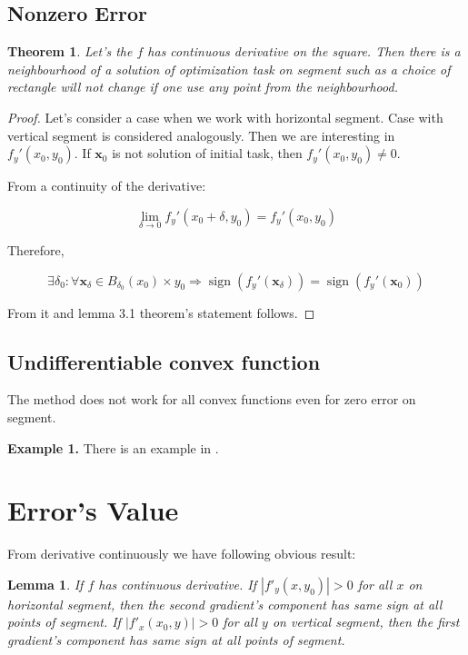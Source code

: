 \documentclass[12pt]{article}
\newtheorem{theorem}{Theorem}[section]
\newtheorem{lemma}{Lemma}[section]
\DeclareMathOperator{\sign}{sign}
\begin{document}
\subsection{Nonzero Error}
\begin{theorem}
Let's the $f$ has continuous derivative on the square. Then there is a neighbourhood of a solution of optimization task on segment such as a choice of rectangle will not change if one use any point from the   neighbourhood.
\end{theorem}
\begin{proof}
Let's consider a case when we work with horizontal segment. Case with vertical segment is considered analogously. Then we are interesting in $f_y'(x_0, y_0)$. If $\textbf{x}_0$ is not solution of initial task, then $f_y'(x_0, y_0) \neq 0$. 

From a continuity of the derivative:

$$\lim\limits_{\delta \rightarrow 0}f_y'(x_0+\delta, y_0) = f_y'(x_0, y_0)$$

Therefore, 

$$\exists \delta_0:\forall \textbf{x}_\delta\in B_{\delta_0}(x_0)\times y_0\Rightarrow \sign(f_y'(\textbf{x}_\delta)) = \sign(f_y'(\textbf{x}_0))$$

From it and lemma 3.1 theorem's statement follows.

\end{proof}

\subsection{Undifferentiable convex function}

The method does not work for all convex functions even for zero error on segment. 

\textbf{Example 1.} There is an example in \cite{Ston_Pas}.

\section{Error's Value}

From derivative continuously we have following obvious result:

\begin{lemma}
If $f$ has continuous derivative. If $|f'_y(x, y_0)| > 0$ for all $x$ on horizontal segment, then the second gradient's component has same sign at all points of segment. If $|f'_x(x_0, y)| > 0$ for all $y$ on vertical segment, then the first gradient's component has same sign at all points of segment.
\end{lemma}
\end{document}
